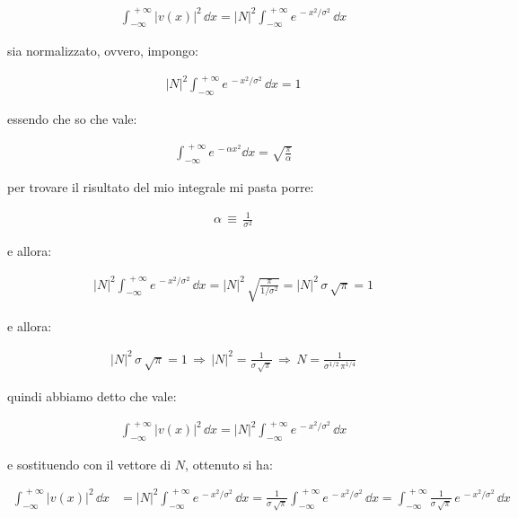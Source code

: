 \begin{align*}
	\int_{-\infty}^{\, + \infty}  |v(x)|^2 \, \dd x = |N|^2 \int_{-\infty}^{\, + \infty} e^{\, - x^2 / \sigma^2} \, \dd x
\end{align*}

	sia normalizzato, ovvero, impongo:
	
\begin{align*}
	|N|^2 \int_{-\infty}^{\, + \infty} e^{\, - x^2 / \sigma^2} \, \dd x = 1
\end{align*}

	essendo che so che vale:
	
\begin{align*}
	\int_{-\infty}^{\, + \infty} e^{\, - \alpha x^2} \dd x = \sqrt{\frac{\pi}{\alpha}}
\end{align*}

	per trovare il risultato del mio integrale mi pasta porre:
	
\begin{align*}
	\alpha \, \equiv \, \frac{1}{\sigma^2}
\end{align*}

	e allora:

\begin{align*}
	|N|^2 \int_{-\infty}^{\, + \infty} e^{\, - x^2 / \sigma^2} \, \dd x = |N|^2 \, \sqrt{\frac{\pi}{1/\sigma^2}} = |N|^2 \, \sigma \, \sqrt{\pi} = 1
\end{align*}

	e allora:
	
\begin{align*}
	|N|^2 \, \sigma \, \sqrt{\pi} = 1 \, \Rightarrow \, |N|^2 = \frac{1}{\sigma \, \sqrt{\pi}} \, \Rightarrow \, N = \frac{1}{\sigma^{1/2} \, \pi^{1/4}}
\end{align*}

	quindi abbiamo detto che vale:
	
\begin{align*}
	\int_{-\infty}^{\, + \infty}  |v(x)|^2 \, \dd x = |N|^2 \int_{-\infty}^{\, + \infty} e^{\, - x^2 / \sigma^2} \, \dd x
\end{align*}

	e sostituendo con il vettore di $N$, ottenuto si ha:

\begin{align*}
	\int_{-\infty}^{\, + \infty}  |v(x)|^2 \, \dd x & = |N|^2 \int_{-\infty}^{\, + \infty} e^{\, - x^2 / \sigma^2} \, \dd x = \frac{1}{\sigma \, \sqrt{\pi}} \int_{-\infty}^{\, + \infty} e^{\, - x^2 / \sigma^2} \, \dd x =  \int_{-\infty}^{\, + \infty}  \frac{1}{\sigma \, \sqrt{\pi}} \, e^{\, - x^2 / \sigma^2} \, \dd x 
\end{align*}

